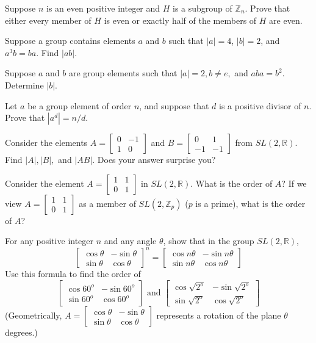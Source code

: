\documentclass[11pt,largemargins]{homework}
\begin{document}
\question
Suppose $n$ is an even positive integer and $H$ is a subgroup of $\mathbb{Z}_n$. Prove that either every member of $H$ is 
even or exactly half of the members of $H$ are even.

\question
Suppose a group contains elements $a$ and $b$ such that $|a|=4$, $|b|=2$, and $a^3b=ba$. Find $|ab|$.

\question
Suppose $a$ and $b$ are group elements such that $|a|=2, b\neq e,$ and $aba=b^2$. Determine $|b|$.

\question
Let $a$ be a group element of order $n$, and suppose that $d$ is a positive divisor of $n$. Prove that $|a^d|=n/d$.

\question
Consider the elements $A = \begin{bmatrix} 0 & -1 \\ 1 & 0 \end{bmatrix}$ and $B = \begin{bmatrix} 0 & 1 \\ -1 & -1 \end{bmatrix}$
from $SL(2, \mathbb{R})$. Find $|A|,|B|,$ and $|AB|$. Does your answer surprise you?

\question
Consider the element $A = \begin{bmatrix} 1 & 1 \\ 0 & 1 \end{bmatrix}$ in $SL(2,\mathbb{R})$. What is the order of $A$? 
If we view $A = \begin{bmatrix} 1 & 1 \\ 0 & 1 \end{bmatrix}$ as a member of $SL(2,\mathbb{Z}_p)$ ($p$ is a prime), 
what is the order of $A$?

\question
For any positive integer $n$ and any angle $\theta$, show that in the group $SL(2,\mathbb{R})$,
\[
\begin{bmatrix}
    \cos\theta & -\sin\theta \\
    \sin\theta & \cos\theta 
\end{bmatrix}^n
=
\begin{bmatrix}
    \cos n\theta & -\sin n\theta \\
    \sin n\theta & \cos n\theta 
\end{bmatrix}
\]
Use this formula to find the order of 
\[
\begin{bmatrix}
    \cos 60^o & -\sin 60^o \\
    \sin 60^o & \cos 60^o 
\end{bmatrix}
\text{ and }
\begin{bmatrix}
    \cos\sqrt{2^o} & -\sin\sqrt{2^o} \\
    \sin\sqrt{2^o} & \cos\sqrt{2^o} 
\end{bmatrix}
\]
(Geometrically, $A = \begin{bmatrix} \cos\theta & -\sin\theta \\ \sin\theta & \cos\theta \end{bmatrix}$ represents a rotation
of the plane $\theta$ degrees.)
\end{document}
